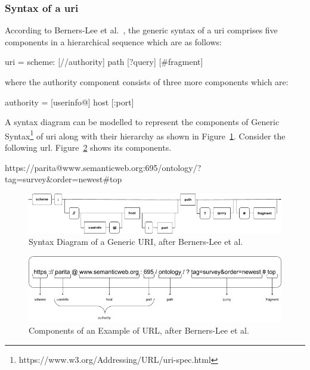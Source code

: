 \begin{doublespace}
\subsubsection{Syntax of a \ac{uri}}
\par According to Berners-Lee et al.~\cite{berners1998uri}, the generic syntax of a \ac{uri} comprises five components in a hierarchical sequence which are as follows:
\begin{center}
\par \ac{uri} = scheme: [//authority] path [?query] [\#fragment]    
\end{center}
where the authority component consists of three more components which are:
\begin{center}
\par authority = [userinfo@] host [:port]
\end{center}
\par A syntax diagram can be modelled to represent the components of Generic Syntax\footnote{https://www.w3.org/Addressing/URL/uri-spec.html} of \ac{uri} along with their hierarchy as shown in Figure~\ref{fig:2.14}. Consider the following \ac{url}. Figure~\ref{fig:2.15} shows its components.
\begin{center}
\par https://parita@www.semanticweb.org:695/ontology/?tag=survey\&order=newest\#top
\end{center}
\begin{figure}[htp]
    \centering
    \includegraphics[width=15cm]{images/ch2/Figure14.png}
    \caption{Syntax Diagram of a Generic URI, after Berners-Lee et al.~\cite{berners1998uri}}
    \label{fig:2.14}
\end{figure}
\begin{figure}[htp]
    \centering
    \includegraphics[width=15cm]{images/ch2/Figure15.png}
    \caption{Components of an Example of URL, after Berners-Lee et al.~\cite{berners1998uri}}
    \label{fig:2.15}
\end{figure}

\end{doublespace}
